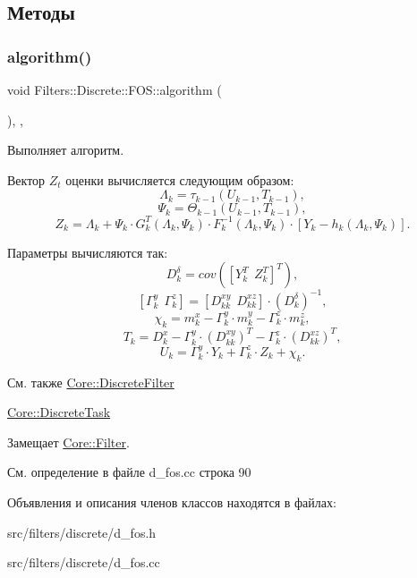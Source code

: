 \subsection{Методы}
\hypertarget{class_filters_1_1_discrete_1_1_f_o_s_a66b52dd04e77257393fe156b71e5582f}{}\label{class_filters_1_1_discrete_1_1_f_o_s_a66b52dd04e77257393fe156b71e5582f} 
\subsubsection{\texorpdfstring{algorithm()}{algorithm()}}
{\footnotesize\ttfamily void Filters\+::\+Discrete\+::\+F\+O\+S\+::algorithm (\begin{DoxyParamCaption}{ }\end{DoxyParamCaption})\hspace{0.3cm}{\ttfamily [override]}, {\ttfamily [protected]}, {\ttfamily [virtual]}}



Выполняет алгоритм. 

Вектор $Z_t$ оценки вычисляется следующим образом\+: \[\Lambda_k = \tau_{k-1}(U_{k-1}, T_{k-1}),\] \[\Psi_k = \Theta_{k-1}(U_{k-1}, T_{k-1}),\] \[Z_k = \Lambda_k + \Psi_k \cdot G_k^T(\Lambda_k, \Psi_k) \cdot F_k^{-1}(\Lambda_k, \Psi_k) \cdot [Y_k - h_k(\Lambda_k, \Psi_k)].\]

Параметры вычисляются так\+: \[D_k^\delta = cov([Y_k^T\ \ Z_k^T]^T),\] \[[\Gamma_k^y\ \ \Gamma_k^z] = [D_{kk}^{xy}\ \ D_{kk}^{xz}] \cdot (D_k^\delta)^{-1},\] \[\chi_k = m_k^x - \Gamma_k^y \cdot m_k^y - \Gamma_k^z \cdot m_k^z,\] \[T_k = D_k^x - \Gamma_k^y \cdot (D_{kk}^{xy})^T - \Gamma_k^z \cdot (D_{kk}^{xz})^T,\] \[U_k = \Gamma_k^y \cdot Y_k + \Gamma_k^z \cdot Z_k + \chi_k.\]

\begin{DoxySeeAlso}{См. также}
\hyperlink{class_core_1_1_discrete_filter}{Core\+::\+Discrete\+Filter} 

\hyperlink{class_core_1_1_discrete_task}{Core\+::\+Discrete\+Task} 
\end{DoxySeeAlso}


Замещает \hyperlink{class_core_1_1_filter_a438681ee3e54aba2148042d9f8011ab8}{Core\+::\+Filter}.



См. определение в файле d\+\_\+fos.\+cc строка 90



Объявления и описания членов классов находятся в файлах\+:\begin{DoxyCompactItemize}
\item 
src/filters/discrete/d\+\_\+fos.\+h\item 
src/filters/discrete/d\+\_\+fos.\+cc\end{DoxyCompactItemize}
